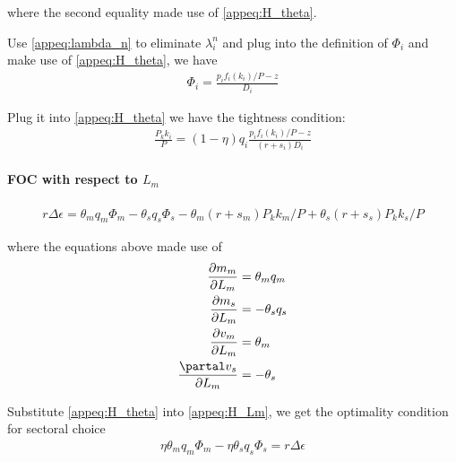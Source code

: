 \documentclass[12pt]{article} %
\theoremstyle{definition}
\begin{document}
where the second  equality made use of \eqref{appeq:H_theta}.  

Use \eqref{appeq:lambda_n} to eliminate $\lambda^n_i$ and plug into the definition of $\Phi_i$ and make use of \eqref{appeq:H_theta}, we have
\begin{align}
    \Phi_i = \frac{p_if_i(k_i)/P-z}{D_i}
\end{align}

Plug it into \eqref{appeq:H_theta} we have the tightness condition:
\begin{align}
 \frac{P_kk_i}{P} = (1-\eta)q_i \frac{p_if_i(k_i)/P-z}{(r+s_i)D_i}
\end{align}



\paragraph{FOC with respect to $L_m$}
\begin{align}
    r\Delta\epsilon =  \theta_mq_m \Phi_m - \theta_sq_s\Phi_s -\theta_m(r+s_m)P_kk_m/P +\theta_s(r+s_s)P_kk_s/P   \label{appeq:H_Lm}
\end{align}



where the  equations above made use of
\begin{align}
    \frac{\partial m_m}{\partial L_m} &= \theta_mq_m  \\
        \frac{\partial m_s}{\partial L_m} &= -\theta_sq_s \\
        \frac{\partial v_m}{\partial L_m} & = \theta_m \\
                \frac{\partal v_s}{\partial L_m} & = - \theta_s \\
\end{align}



Substitute \eqref{appeq:H_theta} into \eqref{appeq:H_Lm},  we get the optimality condition for sectoral choice
\begin{align}
\eta \theta_mq_m\Phi_m - \eta \theta_sq_s\Phi_s = r\Delta\epsilon
\end{align}



\newpage
\setlength{\bibsep}{0pt}
%

 
\end{document}
